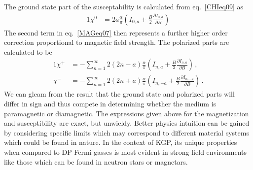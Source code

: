 \documentclass[
aps,
pra,
twocolumn,
showpacs,
preprintnumbers,
amsmath,
amssymb,
footinbib
]{revtex4-2}
\begin{document}
The ground state part of the susceptability is calculated from eq.~\eqref{CHIeq09} as
\begin{alignat}{1}
  \label{MAGeq07} \chi^{0}&=2a\frac{\alpha}{\pi}\left(I_{0,a}+\frac{B}{2}\frac{\partial I_{0,a}}{\partial B}\right)
\end{alignat}
The second term in eq.~\eqref{MAGeq07} then represents a further higher order correction proportional to magnetic field strength. The polarized parts are calculated to be
\begin{alignat}{1}
  \label{MAGeq08} \chi^{+}&=-\sum_{n=1}^{\infty}2(2n-a)\frac{\alpha}{\pi}\left(I_{n,a}+\frac{B}{2}\frac{\partial I_{n,a}}{\partial B}\right)\,,\\
    \label{MAGeq09} \chi^{-}&=-\sum_{n=1}^{\infty}2(2n+a)\frac{\alpha}{\pi}\left(I_{n,-a}+\frac{B}{2}\frac{\partial I_{n,-a}}{\partial B}\right)\,.
\end{alignat}
We can gleam from the result that the ground state and polarized parts will differ in sign and thus compete in determining whether the medium is paramagnetic or diamagnetic. The expressions given above for the magnetization and susceptibility are exact, but unwieldy. Better physics intuition can be gained by considering specific limits which may correspond to different material systems which could be found in nature. In the context of KGP, its unique properties when compared to DP Fermi gasses is most evident in strong field environments like those which can be found in neutron stars or magnetars.
\end{document}
